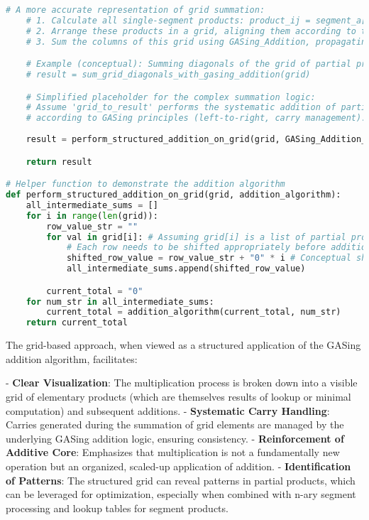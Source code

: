 \begin{lstlisting}[language=Python,caption={GASing\_Multiplication Algorithm}]
    # A more accurate representation of grid summation:
    # 1. Calculate all single-segment products: product_ij = segment_a[j] * segment_b[i]
    # 2. Arrange these products in a grid, aligning them according to their place value.
    # 3. Sum the columns of this grid using GASing_Addition, propagating carries.

    # Example (conceptual): Summing diagonals of the grid of partial products
    # result = sum_grid_diagonals_with_gasing_addition(grid)

    # Simplified placeholder for the complex summation logic:
    # Assume 'grid_to_result' performs the systematic addition of partial products
    # according to GASing principles (left-to-right, carry management).
    
    result = perform_structured_addition_on_grid(grid, GASing_Addition_function_pointer)

    return result

# Helper function to demonstrate the addition algorithm
def perform_structured_addition_on_grid(grid, addition_algorithm):
    all_intermediate_sums = []
    for i in range(len(grid)):
        row_value_str = ""
        for val in grid[i]: # Assuming grid[i] is a list of partial products
            # Each row needs to be shifted appropriately before addition
            shifted_row_value = row_value_str + "0" * i # Conceptual shift
            all_intermediate_sums.append(shifted_row_value)

        current_total = "0"
    for num_str in all_intermediate_sums:
        current_total = addition_algorithm(current_total, num_str)
    return current_total
\end{lstlisting}


The grid-based approach, when viewed as a structured application of the GASing addition algorithm, facilitates:

-   \textbf{Clear Visualization}: The multiplication process is broken down into a visible grid of elementary products (which are themselves results of lookup or minimal computation) and subsequent additions.
-   \textbf{Systematic Carry Handling}: Carries generated during the summation of grid elements are managed by the underlying GASing addition logic, ensuring consistency.
-   \textbf{Reinforcement of Additive Core}: Emphasizes that multiplication is not a fundamentally new operation but an organized, scaled-up application of addition.
-   \textbf{Identification of Patterns}: The structured grid can reveal patterns in partial products, which can be leveraged for optimization, especially when combined with n-ary segment processing and lookup tables for segment products.


